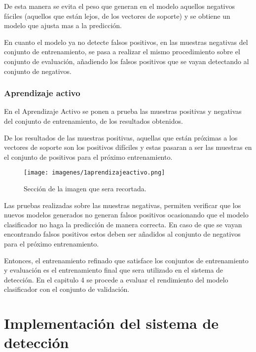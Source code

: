 \noindent De esta manera se evita el peso que generan en el modelo aquellos negativos fáciles (aquellos que están lejos, de los vectores de soporte) y se obtiene un modelo que ajusta mas a la predicción.

\noindent En cuanto el modelo ya no detecte falsos positivos, en las muestras negativas del conjunto de entrenamiento, se pasa a realizar el mismo procedimiento sobre el conjunto de evaluación, añadiendo los falsos positivos que se vayan detectando al conjunto de negativos.

\subsubsection{Aprendizaje activo}

\noindent En el Aprendizaje Activo se ponen a prueba las muestras positivas y negativas del conjunto de entrenamiento, de los resultados obtenidos.

\noindent De los resultados de las muestras positivas, aquellas que están próximas a los vectores de soporte son los positivos difíciles y estas pasaran a ser las muestras en el conjunto de positivos para el próximo entrenamiento.

\begin{figure}[H]
\centering
{\texttt{[image: imagenes/1aprendizajeactivo.png]}}
\caption{Sección de la imagen que sera recortada.}
\label{fig:sectorRecorte}
\end{figure}

\noindent Las pruebas realizadas sobre las muestras negativas, permiten verificar que los nuevos modelos generados no generan falsos positivos ocasionando que el modelo clasificador no haga la predicción de manera correcta. En caso de que se vayan encontrando falsos positivos estos deben ser añadidos al conjunto de negativos para el próximo entrenamiento.

\noindent Entonces, el entrenamiento refinado que satisface los conjuntos de entrenamiento y evaluación es el entrenamiento final que sera utilizado en el sistema de detección. En el capitulo 4 se procede a evaluar el rendimiento del modelo clasificador con el conjunto de validación.

\section{Implementación del sistema de detección}

